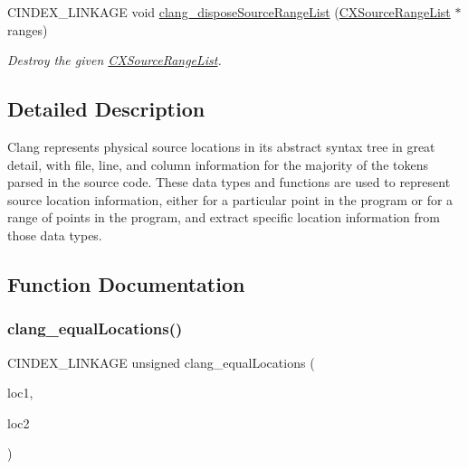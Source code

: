\begin{DoxyCompactItemize}
\mbox{\label{group__CINDEX__LOCATIONS_ga6305dd3e01bbfa8a999f47bd2cae2506}} 
C\+I\+N\+D\+E\+X\+\_\+\+L\+I\+N\+K\+A\+GE void \hyperlink{group__CINDEX__LOCATIONS_ga6305dd3e01bbfa8a999f47bd2cae2506}{clang\+\_\+dispose\+Source\+Range\+List} (\hyperlink{structCXSourceRangeList}{C\+X\+Source\+Range\+List} $\ast$ranges)
\begin{DoxyCompactList}\small\item\em Destroy the given {\ttfamily \hyperlink{structCXSourceRangeList}{C\+X\+Source\+Range\+List}}. \end{DoxyCompactList}\end{DoxyCompactItemize}


\subsection{Detailed Description}
Clang represents physical source locations in its abstract syntax tree in great detail, with file, line, and column information for the majority of the tokens parsed in the source code. These data types and functions are used to represent source location information, either for a particular point in the program or for a range of points in the program, and extract specific location information from those data types. 

\subsection{Function Documentation}
\mbox{\label{group__CINDEX__LOCATIONS_gabb1ee8108ded5d3eafa6d059eb473ef8}} 
\subsubsection{\texorpdfstring{clang\+\_\+equal\+Locations()}{clang\_equalLocations()}}
{\footnotesize\ttfamily C\+I\+N\+D\+E\+X\+\_\+\+L\+I\+N\+K\+A\+GE unsigned clang\+\_\+equal\+Locations (\begin{DoxyParamCaption}\item[{\hyperlink{structCXSourceLocation}{C\+X\+Source\+Location}}]{loc1,  }\item[{\hyperlink{structCXSourceLocation}{C\+X\+Source\+Location}}]{loc2 }\end{DoxyParamCaption})}



